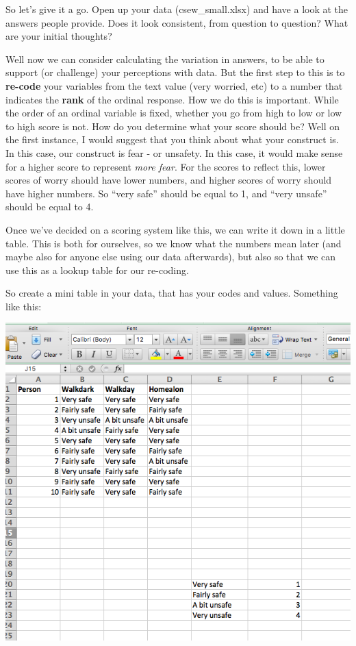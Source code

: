 \documentclass[]{book}
\theoremstyle{definition}
\theoremstyle{definition}
\theoremstyle{definition}
\theoremstyle{remark}
\begin{document}
 So let's give it a go. Open up your data (csew\_small.xlsx) and have a
look at the answers people provide. Does it look consistent, from
question to question? What are your initial thoughts?

Well now we can consider calculating the variation in answers, to be
able to support (or challenge) your perceptions with data. But the first
step to this is to \textbf{re-code} your variables from the text value
(very worried, etc) to a number that indicates the \textbf{rank} of the
ordinal response. How we do this is important. While the order of an
ordinal variable is fixed, whether you go from high to low or low to
high score is not. How do you determine what your score should be? Well
on the first instance, I would suggest that you think about what your
construct is. In this case, our construct is fear - or unsafety. In this
case, it would make sense for a higher score to represent \emph{more
fear}. For the scores to reflect this, lower scores of worry should have
lower numbers, and higher scores of worry should have higher numbers. So
``very safe'' should be equal to 1, and ``very unsafe'' should be equal
to 4.

Once we've decided on a scoring system like this, we can write it down
in a little table. This is both for ourselves, so we know what the
numbers mean later (and maybe also for anyone else using our data
afterwards), but also so that we can use this as a lookup table for our
re-coding.

So create a mini table in your data, that has your codes and values.
Something like this:

\includegraphics{imgs/lookup_table.png}
\end{document}
